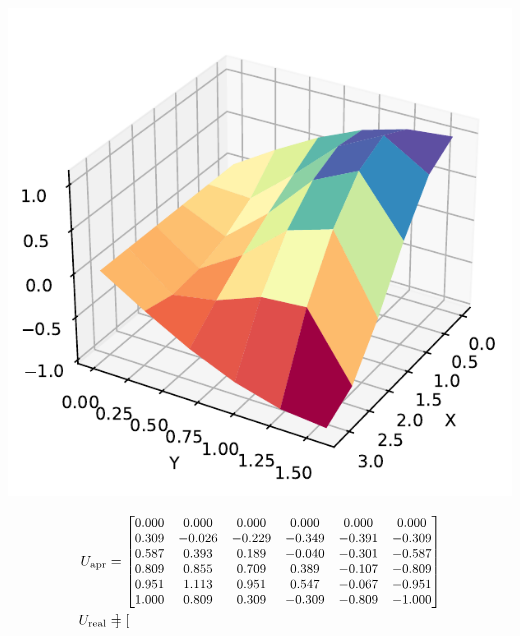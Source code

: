 \documentclass[a4paper, 11pt]{report}
\begin{document}
\begin{enumerate}[leftmargin=*]
\begin{enumerate}[leftmargin=*, label=\alph*.]
        \begin{minipage}{0.35\columnwidth}
            \includegraphics[width=\columnwidth]{../edp/12.1_3b.pdf}
        \end{minipage}
        \begin{minipage}{0.6\columnwidth}
            \begin{align*}
                U_{\text{apr}} &= 
                {\small
                \begin{bmatrix}
                    0.000 &  0.000 &  0.000 &  0.000 &  0.000 &  0.000\\
                    0.309 & -0.026 & -0.229 & -0.349 & -0.391 & -0.309\\
                    0.587 &  0.393 &  0.189 & -0.040 & -0.301 & -0.587\\
                    0.809 &  0.855 &  0.709 &  0.389 & -0.107 & -0.809\\
                    0.951 &  1.113 &  0.951 &  0.547 & -0.067 & -0.951\\
                    1.000 &  0.809 &  0.309 & -0.309 & -0.809 & -1.000\\     
                \end{bmatrix}}\\
                U_{\text{real}} &=
                {\small
                \begin{bmatrix}

\end{bmatrix}}
\end{align*}
\end{minipage}
\end{enumerate}
\end{enumerate}
\end{document}
